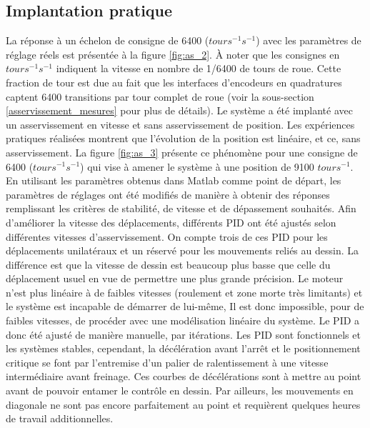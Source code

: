 \subsection{Implantation pratique}
\label{s:ass_implantation_pratique}
La réponse à un échelon de consigne de 6400 ($tours^{-1} s^{-1}$) avec les paramètres de réglage réels est présentée à la figure \ref{fig:as_2}. À noter que les consignes en $tours^{-1} s^{-1}$ indiquent la vitesse en nombre de 1/6400 de tours de roue. Cette fraction de tour est due au fait que les interfaces d'encodeurs en quadratures captent 6400 transitions par tour complet de roue (voir la sous-section \ref{asservissement_mesures} pour plus de détails).
Le système a été implanté avec un asservissement en vitesse et sans asservissement de position. Les expériences pratiques réalisées montrent que l'évolution de la position est linéaire, et ce, sans asservissement. La figure \ref{fig:as_3} présente ce phénomène pour une consigne de 6400 ($tours^{-1} s^{-1}$) qui vise à amener le système à une position de 9100 $tours^{-1}$.
En utilisant les paramètres obtenus dans Matlab comme point de départ, les paramètres de réglages ont été modifiés de manière à obtenir des réponses remplissant les critères de stabilité, de vitesse et de dépassement souhaités. Afin d'améliorer la vitesse des déplacements, différents PID ont été ajustés selon différentes vitesses d'asservissement. On compte trois de ces PID pour les déplacements unilatéraux et un réservé pour les mouvements reliés au dessin. La différence est que la vitesse de dessin est beaucoup plus basse que celle du déplacement usuel en vue de permettre une plus grande précision. Le moteur n'est plus linéaire à de faibles vitesses (roulement et zone morte très limitants) et le système est incapable de démarrer de lui-même, Il est donc impossible, pour de faibles vitesses, de procéder avec une modélisation linéaire du système. Le PID a donc été ajusté de manière manuelle, par itérations. Les PID sont fonctionnels et les systèmes stables, cependant, la décélération avant l'arrêt et le positionnement critique se font par l'entremise d'un palier de ralentissement à une vitesse intermédiaire avant freinage. Ces courbes de décélérations sont à mettre au point avant de pouvoir entamer le contrôle en dessin. Par ailleurs, les mouvements en diagonale ne sont pas encore parfaitement au point et requièrent quelques heures de travail additionnelles.
